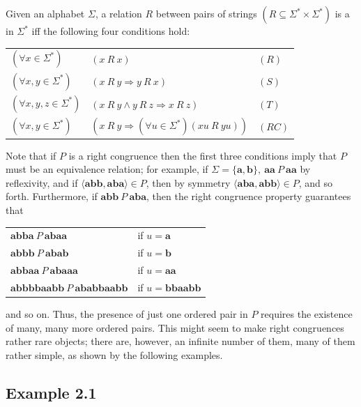 \begin{dfn}\label{dfn-2.1}
Given an alphabet $\Sigma$, a relation $R$ between pairs of strings
$(R \subseteq \Sigma^* \times \Sigma^*)$ is a \emph{} in
$\Sigma^*$ iff the following four conditions hold:
\begin{center}\begin{tabular}{lll}
$(\forall x \in \Sigma^*)$ & $(x\ R\ x)$ & $(R)$ \\
$(\forall x,y \in \Sigma^*)$ & $(x\ R\ y \Rightarrow y\ R\ x)$ & $(S)$ \\
$(\forall x,y,z \in \Sigma^*)$ & $(x\ R\ y \wedge y\ R\ z \Rightarrow x\ R\ z)$
	& $(T)$ \\
$(\forall x,y \in \Sigma^*)$ & $(x \ R\ y \Rightarrow (\forall u \in \Sigma^*)
	(xu \ R\ yu))$ & $(RC)$
\end{tabular}\end{center}
\end{dfn}

Note that if $P$ is a right congruence then the first three conditions imply
that $P$ must be an equivalence relation; for example, if $\Sigma=\{\pmb{a},
\pmb{b}\},\ \pmb{aa}\ P\ \pmb{aa}$ by reflexivity, and if $\langle\pmb{abb},
\pmb{aba}\rangle \in P$, then by symmetry $\langle\pmb{aba},\pmb{abb}\rangle
\in P$, and so forth. Furthermore, if $\pmb{abb}\ P\ \pmb{aba}$, then the right
congruence property guarantees that
\begin{center}\begin{tabular}{ll}
$\pmb{abba}\ P\ \pmb{abaa}$ & if $u = \pmb{a}$ \\ 
$\pmb{abbb}\ P\ \pmb{abab}$ & if $u = \pmb{b}$ \\
$\pmb{abbaa}\ P\ \pmb{abaaa}$ & if $u = \pmb{aa}$ \\
$\pmb{abbbbaabb}\ P\ \pmb{ababbaabb}$ & if $u = \pmb{bbaabb}$ \\
\end{tabular}\end{center}
and so on. Thus, the presence of just one ordered pair in $P$ requires the
existence of many, many more ordered pairs. This might seem to make right
congruences rather rare objects; there are, however, an infinite number of them,
many of them rather simple, as shown by the following examples.

\subsection*{Example 2.1}


